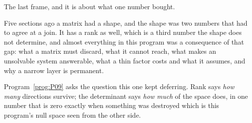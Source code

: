 \begin{fr}
The last frame, and it is about what one number bought.

Five sections ago a matrix had a shape, and the shape was two numbers that had
to agree at a join. It has a rank as well, which is a third number the shape
does not determine, and almost everything in this program was a consequence of
that gap: what a matrix must discard, what it cannot reach, what makes an
unsolvable system answerable, what a thin factor costs and what it assumes, and
why a narrow layer is permanent.

Program~\ref{prog:P09} asks the question this one kept deferring. Rank says
\emph{how many} directions survive; the determinant says \emph{how much} of the
space does, in one number that is zero exactly when something was destroyed
\dash{} which is this program's null space seen from the other side.
\end{fr}

